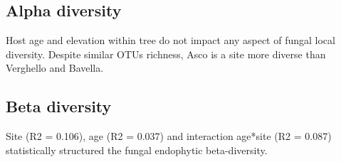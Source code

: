 \documentclass[12pt]{article}\usepackage[]{graphicx}\usepackage[]{color}
\numberwithin{figure}{section}
\begin{document}
  \subsection{Alpha diversity}

Host age and elevation within tree do not impact any aspect of fungal local diversity. Despite similar OTUs richness, Asco is a site more diverse than Verghello and Bavella.

  \subsection{Beta diversity}

Site (R2 = 0.106), age (R2 = 0.037) and interaction age*site (R2 = 0.087) statistically structured the fungal endophytic beta-diversity. 


\cleardoublepage
\listoffigures
\listoftables
\end{document}
